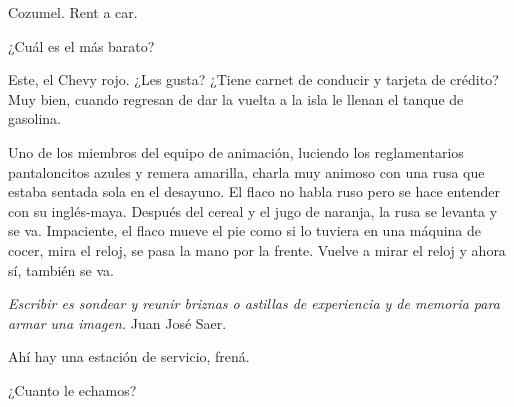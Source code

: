 \documentclass[12pt,twoside,openright,a5paper]{book}
\begin{document}
\vspace{0.5cm}

\hrulefill\hspace{0.2cm} \decofourleft\decofourright \hspace{0.2cm} \hrulefill
\vspace{0.5cm}

Cozumel. Rent a car.

¿Cuál es el más barato?

Este, el Chevy rojo. ¿Les gusta? ¿Tiene carnet de conducir y tarjeta de
crédito? Muy bien, cuando regresan de dar la vuelta a la isla le llenan
el tanque de gasolina.

\vspace{0.5cm}

\hrulefill\hspace{0.2cm} \decofourleft\decofourright \hspace{0.2cm} \hrulefill
\vspace{0.5cm}

Uno de los miembros del equipo de animación, luciendo los reglamentarios
pantaloncitos azules y remera amarilla, charla muy animoso con una rusa que
estaba sentada sola en el desayuno. El flaco no habla ruso pero se hace
entender con su inglés-maya. Después del cereal y el jugo de naranja,
la rusa se levanta y se va. Impaciente, el flaco mueve el pie como si lo
tuviera en una máquina de cocer, mira el reloj, se pasa la mano por la
frente. Vuelve a mirar el reloj y ahora sí, también se va.

\vspace{0.5cm}

\hrulefill\hspace{0.2cm} \decofourleft\decofourright \hspace{0.2cm} \hrulefill
\vspace{0.5cm}

 \emph{Escribir es sondear y reunir briznas o
astillas de experiencia y de memoria para armar una imagen.} Juan José Saer.

\vspace{0.5cm}

\hrulefill\hspace{0.2cm} \decofourleft\decofourright \hspace{0.2cm} \hrulefill
\vspace{0.5cm}

Ahí hay una estación de servicio, frená.

¿Cuanto le echamos?
\end{document}
